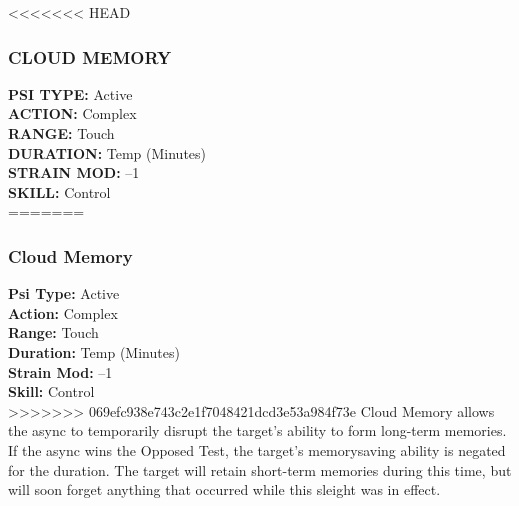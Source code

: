 <<<<<<< HEAD \subsubsection{CLOUD MEMORY} \textbf{PSI TYPE:} Active \\ \textbf{ACTION:} Complex \\ \textbf{RANGE:} Touch \\ \textbf{DURATION:} Temp (Minutes) \\ \textbf{STRAIN MOD:} –1 \\ \textbf{SKILL:} Control\\ ======= \subsubsection{Cloud Memory} \textbf{Psi Type:} Active \\ \textbf{Action:} Complex \\ \textbf{Range:} Touch \\ \textbf{Duration:} Temp (Minutes) \\ \textbf{Strain Mod:} –1 \\ \textbf{Skill:} Control\\ >>>>>>> 069efc938e743c2e1f7048421dcd3e53a984f73e Cloud Memory allows the async to temporarily disrupt the target’s ability to form long-term memories. If the async wins the Opposed Test, the target’s memorysaving ability is negated for the duration. The target will retain short-term memories during this time, but will soon forget anything that occurred while this sleight was in effect. 


